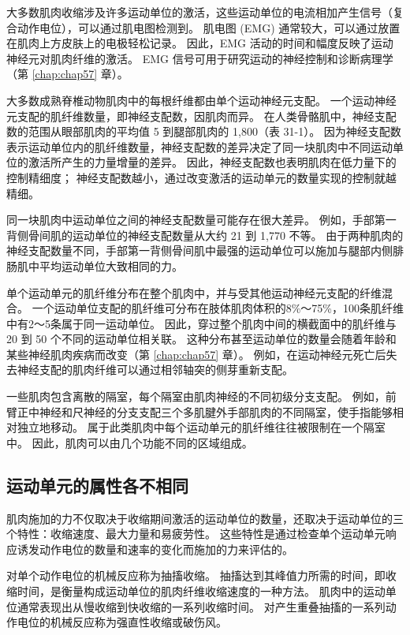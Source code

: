 大多数肌肉收缩涉及许多运动单位的激活，这些运动单位的电流相加产生信号（复合动作电位），可以通过肌电图检测到。
肌电图 (EMG) 通常较大，可以通过放置在肌肉上方皮肤上的电极轻松记录。
因此，EMG 活动的时间和幅度反映了运动神经元对肌肉纤维的激活。
EMG 信号可用于研究运动的神经控制和诊断病理学（第 \ref{chap:chap57} 章）。


大多数成熟脊椎动物肌肉中的每根纤维都由单个运动神经元支配。
一个运动神经元支配的肌纤维数量，即神经支配数，因肌肉而异。
在人类骨骼肌中，神经支配数的范围从眼部肌肉的平均值 5 到腿部肌肉的 1,800（表 31-1）。
因为神经支配数表示运动单位内的肌纤维数量，神经支配数的差异决定了同一块肌肉中不同运动单位的激活所产生的力量增量的差异。
因此，神经支配数也表明肌肉在低力量下的控制精细度； 神经支配数越小，通过改变激活的运动单元的数量实现的控制就越精细。


同一块肌肉中运动单位之间的神经支配数量可能存在很大差异。
例如，手部第一背侧骨间肌的运动单位的神经支配数量从大约 21 到 1,770 不等。
由于两种肌肉的神经支配数量不同，手部第一背侧骨间肌中最强的运动单位可以施加与腿部内侧腓肠肌中平均运动单位大致相同的力。


单个运动单元的肌纤维分布在整个肌肉中，并与受其他运动神经元支配的纤维混合。
一个运动单位支配的肌纤维可分布在肢体肌肉体积的8\%～75\%，100条肌纤维中有2～5条属于同一运动单位。
因此，穿过整个肌肉中间的横截面中的肌纤维与 20 到 50 个不同的运动单位相关联。
这种分布甚至运动单位的数量会随着年龄和某些神经肌肉疾病而改变（第 \ref{chap:chap57} 章）。
例如，在运动神经元死亡后失去神经支配的肌肉纤维可以通过相邻轴突的侧芽重新支配。


一些肌肉包含离散的隔室，每个隔室由肌肉神经的不同初级分支支配。
例如，前臂正中神经和尺神经的分支支配三个多肌腱外手部肌肉的不同隔室，使手指能够相对独立地移动。
属于此类肌肉中每个运动单元的肌纤维往往被限制在一个隔室中。
因此，肌肉可以由几个功能不同的区域组成。


\subsection{运动单元的属性各不相同}

肌肉施加的力不仅取决于收缩期间激活的运动单位的数量，还取决于运动单位的三个特性：收缩速度、最大力量和易疲劳性。
这些特性是通过检查单个运动单元响应诱发动作电位的数量和速率的变化而施加的力来评估的。


对单个动作电位的机械反应称为抽搐收缩。
抽搐达到其峰值力所需的时间，即收缩时间，是衡量构成运动单位的肌肉纤维收缩速度的一种方法。
肌肉中的运动单位通常表现出从慢收缩到快收缩的一系列收缩时间。
对产生重叠抽搐的一系列动作电位的机械反应称为强直性收缩或破伤风。


